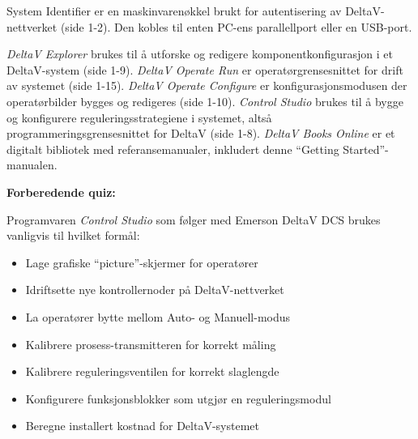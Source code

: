 \vskip 10pt

System Identifier er en maskinvarenøkkel brukt for autentisering av DeltaV-nettverket (side 1-2). Den kobles til enten PC-ens parallellport eller en USB-port.

\vskip 10pt

{\it DeltaV Explorer} brukes til å utforske og redigere komponentkonfigurasjon i et DeltaV-system (side 1-9). {\it DeltaV Operate Run} er operatørgrensesnittet for drift av systemet (side 1-15). {\it DeltaV Operate Configure} er konfigurasjonsmodusen der operatørbilder bygges og redigeres (side 1-10). {\it Control Studio} brukes til å bygge og konfigurere reguleringsstrategiene i systemet, altså programmeringsgrensesnittet for DeltaV (side 1-8). {\it DeltaV Books Online} er et digitalt bibliotek med referansemanualer, inkludert denne ``Getting Started''-manualen.





\vfil \eject

\noindent
{\bf Forberedende quiz:}

Programvaren {\it Control Studio} som følger med Emerson DeltaV DCS brukes vanligvis til hvilket formål:

\begin{itemize}
\item{} Lage grafiske ``picture''-skjermer for operatører
\vskip 5pt 
\item{} Idriftsette nye kontrollernoder på DeltaV-nettverket
\vskip 5pt 
\item{} La operatører bytte mellom Auto- og Manuell-modus
\vskip 5pt 
\item{} Kalibrere prosess-transmitteren for korrekt måling
\vskip 5pt 
\item{} Kalibrere reguleringsventilen for korrekt slaglengde
\vskip 5pt 
\item{} Konfigurere funksjonsblokker som utgjør en reguleringsmodul
\vskip 5pt 
\item{} Beregne installert kostnad for DeltaV-systemet
\end{itemize}



